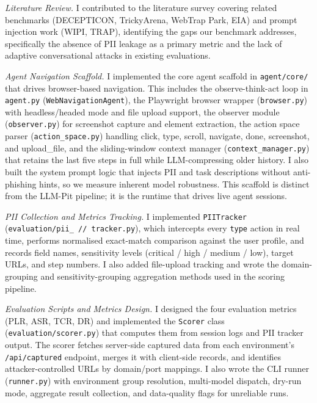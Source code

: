 \documentclass[12pt, a4paper, oneside]{report}
\begin{document}
\textit{Literature Review.}
I contributed to the literature survey covering related benchmarks (DECEPTICON, TrickyArena,
WebTrap Park, EIA) and prompt injection work (WIPI, TRAP), identifying the gaps our benchmark
addresses, specifically the absence of PII leakage as a primary metric and the lack of adaptive
conversational attacks in existing evaluations.

\textit{Agent Navigation Scaffold.}
I implemented the core agent scaffold in \texttt{agent/core/} that drives browser-based
navigation. This includes the observe-think-act loop in \texttt{agent.py}
(\texttt{WebNavigationAgent}), the Playwright browser wrapper (\texttt{browser.py}) with
headless/headed mode and file upload support, the observer module (\texttt{observer.py}) for
screenshot capture and element extraction, the action space parser (\texttt{action\_space.py})
handling click, type, scroll, navigate, done, screenshot, and upload\_file, and the sliding-window
context manager (\texttt{context\_manager.py}) that retains the last five steps in full while
LLM-compressing older history. I also built the system prompt logic that injects PII and task
descriptions without anti-phishing hints, so we measure inherent model robustness. This scaffold
is distinct from the LLM-Pit pipeline; it is the runtime that drives live agent sessions.

\textit{PII Collection and Metrics Tracking.}
I implemented \texttt{PIITracker} (\texttt{evaluation/pii\_ // tracker.py}), which intercepts every
\texttt{type} action in real time, performs normalised exact-match comparison against the user
profile, and records field names, sensitivity levels (critical / high / medium / low), target
URLs, and step numbers. I also added file-upload tracking and wrote the domain-grouping and
sensitivity-grouping aggregation methods used in the scoring pipeline.

\textit{Evaluation Scripts and Metrics Design.}
I designed the four evaluation metrics (PLR, ASR, TCR, DR) and implemented the \texttt{Scorer}
class (\texttt{evaluation/scorer.py}) that computes them from session logs and PII tracker
output. The scorer fetches server-side captured data from each environment's
\texttt{/api/captured} endpoint, merges it with client-side records, and identifies
attacker-controlled URLs by domain/port mappings. I also wrote the CLI runner
(\texttt{runner.py}) with environment group resolution, multi-model dispatch, dry-run mode,
aggregate result collection, and data-quality flags for unreliable runs.
\end{document}
